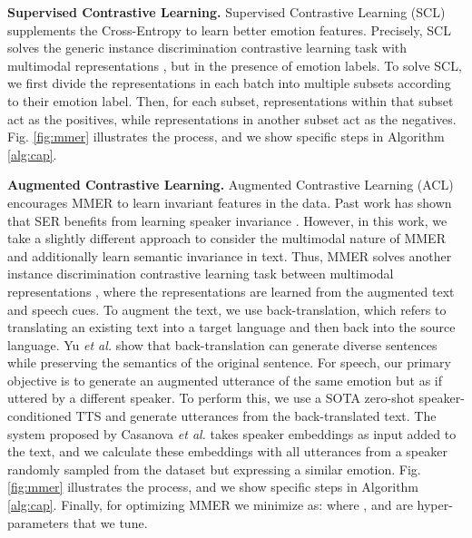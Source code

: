 \documentclass{INTERSPEECH2023}
\begin{document}
{\noindent \textbf{Supervised Contrastive Learning.}} Supervised Contrastive Learning (SCL) \cite{khosla2020supervised} supplements the Cross-Entropy to learn better emotion features. Precisely, SCL solves the generic instance discrimination contrastive learning task with multimodal representations , but in the presence of emotion labels. To solve SCL, we first divide the representations in each batch into multiple subsets according to their emotion label. Then, for each subset, representations within that subset act as the positives, while representations in another subset act as the negatives. Fig. \ref{fig:mmer} illustrates the process, and we show specific steps in Algorithm \ref{alg:cap}.
\vspace{1mm}

{\noindent \textbf{Augmented Contrastive Learning.}} Augmented Contrastive Learning (ACL) encourages MMER to learn invariant features in the data. Past work has shown that SER benefits from learning speaker invariance \cite{9054580}. However, in this work, we take a slightly different approach to consider the multimodal nature of MMER and additionally learn semantic invariance in text. Thus, MMER solves another instance discrimination contrastive learning task between multimodal representations , where the representations are learned from the augmented text and speech cues. To augment the text, we use back-translation, which refers to translating an existing text into a target language and then back into the source language. Yu \textit{et al.} \cite{yu2018qanet} show that back-translation can generate diverse sentences while preserving the semantics of the original sentence. For speech, our primary objective is to generate an augmented utterance of the same emotion but as if uttered by a different speaker. To perform this, we use a SOTA zero-shot speaker-conditioned TTS \cite{casanova2022yourtts} and generate utterances from the back-translated text. The system proposed by Casanova \textit{et al.} \cite{casanova2022yourtts} takes speaker embeddings as input added to the text, and we calculate these embeddings with all utterances from a speaker randomly sampled from the dataset but expressing a similar emotion. Fig. \ref{fig:mmer} illustrates the process, and we show specific steps in Algorithm \ref{alg:cap}. Finally, for optimizing MMER we minimize  as:  where ,  and  are hyper-parameters that we tune.
\end{document}
